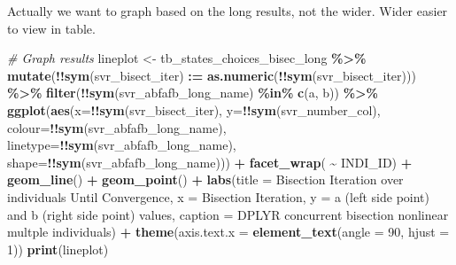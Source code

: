 \documentclass[
]{book}
\newenvironment{Shaded}{\begin{snugshade}}{\end{snugshade}}
\newcommand{\CommentTok}[1]{\textcolor[rgb]{0.56,0.35,0.01}{\textit{#1}}}
\newcommand{\DataTypeTok}[1]{\textcolor[rgb]{0.13,0.29,0.53}{#1}}
\newcommand{\DecValTok}[1]{\textcolor[rgb]{0.00,0.00,0.81}{#1}}
\newcommand{\ErrorTok}[1]{\textcolor[rgb]{0.64,0.00,0.00}{\textbf{#1}}}
\newcommand{\KeywordTok}[1]{\textcolor[rgb]{0.13,0.29,0.53}{\textbf{#1}}}
\newcommand{\NormalTok}[1]{#1}
\newcommand{\OperatorTok}[1]{\textcolor[rgb]{0.81,0.36,0.00}{\textbf{#1}}}
\newcommand{\StringTok}[1]{\textcolor[rgb]{0.31,0.60,0.02}{#1}}
\begin{document}
Actually we want to graph based on the long results, not the wider. Wider easier to view in table.

\begin{Shaded}
\begin{Highlighting}[]
\CommentTok{\# Graph results}
\NormalTok{lineplot \textless{}{-}}\StringTok{ }\NormalTok{tb\_states\_choices\_bisec\_long }\OperatorTok{\%\textgreater{}\%}
\StringTok{    }\KeywordTok{mutate}\NormalTok{(}\OperatorTok{!!}\KeywordTok{sym}\NormalTok{(svr\_bisect\_iter) }\OperatorTok{:}\ErrorTok{=}\StringTok{ }\KeywordTok{as.numeric}\NormalTok{(}\OperatorTok{!!}\KeywordTok{sym}\NormalTok{(svr\_bisect\_iter))) }\OperatorTok{\%\textgreater{}\%}
\StringTok{    }\KeywordTok{filter}\NormalTok{(}\OperatorTok{!!}\KeywordTok{sym}\NormalTok{(svr\_abfafb\_long\_name) }\OperatorTok{\%in\%}\StringTok{ }\KeywordTok{c}\NormalTok{(}\StringTok{\textquotesingle{}a\textquotesingle{}}\NormalTok{, }\StringTok{\textquotesingle{}b\textquotesingle{}}\NormalTok{)) }\OperatorTok{\%\textgreater{}\%}
\StringTok{    }\KeywordTok{ggplot}\NormalTok{(}\KeywordTok{aes}\NormalTok{(}\DataTypeTok{x=}\OperatorTok{!!}\KeywordTok{sym}\NormalTok{(svr\_bisect\_iter), }\DataTypeTok{y=}\OperatorTok{!!}\KeywordTok{sym}\NormalTok{(svr\_number\_col),}
               \DataTypeTok{colour=}\OperatorTok{!!}\KeywordTok{sym}\NormalTok{(svr\_abfafb\_long\_name),}
               \DataTypeTok{linetype=}\OperatorTok{!!}\KeywordTok{sym}\NormalTok{(svr\_abfafb\_long\_name),}
               \DataTypeTok{shape=}\OperatorTok{!!}\KeywordTok{sym}\NormalTok{(svr\_abfafb\_long\_name))) }\OperatorTok{+}
\StringTok{        }\KeywordTok{facet\_wrap}\NormalTok{( }\OperatorTok{\textasciitilde{}}\StringTok{ }\NormalTok{INDI\_ID) }\OperatorTok{+}
\StringTok{        }\KeywordTok{geom\_line}\NormalTok{() }\OperatorTok{+}
\StringTok{        }\KeywordTok{geom\_point}\NormalTok{() }\OperatorTok{+}
\StringTok{        }\KeywordTok{labs}\NormalTok{(}\DataTypeTok{title =} \StringTok{\textquotesingle{}Bisection Iteration over individuals Until Convergence\textquotesingle{}}\NormalTok{,}
             \DataTypeTok{x =} \StringTok{\textquotesingle{}Bisection Iteration\textquotesingle{}}\NormalTok{,}
             \DataTypeTok{y =} \StringTok{\textquotesingle{}a (left side point) and b (right side point) values\textquotesingle{}}\NormalTok{,}
             \DataTypeTok{caption =} \StringTok{\textquotesingle{}DPLYR concurrent bisection nonlinear multple individuals\textquotesingle{}}\NormalTok{) }\OperatorTok{+}
\StringTok{      }\KeywordTok{theme}\NormalTok{(}\DataTypeTok{axis.text.x =} \KeywordTok{element\_text}\NormalTok{(}\DataTypeTok{angle =} \DecValTok{90}\NormalTok{, }\DataTypeTok{hjust =} \DecValTok{1}\NormalTok{))}
\KeywordTok{print}\NormalTok{(lineplot)}
\end{Highlighting}
\end{Shaded}
\end{document}
